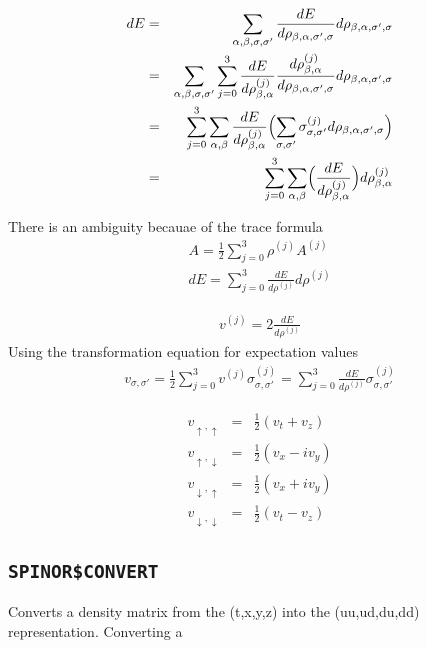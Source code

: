 \documentclass[11pt,a4paper]{report}
\begin{document}
\begin{eqnarray}
dE&=&
\sum_{\alpha,\beta,\sigma,\sigma'}
\frac{dE}{d\rho_{\beta,\alpha,\sigma',\sigma}}
d\rho_{\beta,\alpha,\sigma',\sigma}
\nonumber\\
&=&\sum_{\alpha,\beta,\sigma,\sigma'}
\sum_{j=0}^3\frac{dE}{d\rho^{(j)}_{\beta,\alpha}}
\frac{d\rho^{(j)}_{\beta,\alpha}}{d\rho_{\beta,\alpha,\sigma',\sigma}}
d\rho_{\beta,\alpha,\sigma',\sigma}
\nonumber\\
&=&\sum_{j=0}^3
\sum_{\alpha,\beta}
\frac{dE}{d\rho^{(j)}_{\beta,\alpha}}
\Bigl(
\sum_{\sigma,\sigma'}
\sigma^{(j)}_{\sigma,\sigma'}
d\rho_{\beta,\alpha,\sigma',\sigma}
\Bigr)
\nonumber\\
&=&\sum_{j=0}^3
\sum_{\alpha,\beta}
\Bigl(\frac{dE}{d\rho^{(j)}_{\beta,\alpha}}\Bigr)
d\rho^{(j)}_{\beta,\alpha}
\end{eqnarray}

There is an ambiguity becauae of the trace formula
\begin{eqnarray}
A=\frac{1}{2}\sum_{j=0}^3 \rho^{(j)} A^{(j)}
\\
dE=\sum_{j=0}^3 \frac{dE}{d\rho^{(j)}}d\rho^{(j)}
\end{eqnarray}

\begin{eqnarray}
v^{(j)}=2\frac{dE}{d\rho^{(j)}}
\end{eqnarray}
Using the transformation equation for expectation values
\begin{eqnarray}
v_{\sigma,\sigma'}
=\frac{1}{2}\sum_{j=0}^3 v^{(j)}\sigma^{(j)}_{\sigma,\sigma'}
=\sum_{j=0}^3 \frac{dE}{d\rho^{(j)}}
\sigma^{(j)}_{\sigma,\sigma'}
\end{eqnarray}

\begin{eqnarray}
v_{\uparrow,\uparrow}&=&\frac{1}{2}(v_t+v_z)
\nonumber\\
v_{\uparrow,\downarrow}&=&\frac{1}{2}(v_x-iv_y)
\nonumber\\
v_{\downarrow,\uparrow}&=&\frac{1}{2}(v_x+iv_y)
\nonumber\\
v_{\downarrow,\downarrow}&=&\frac{1}{2}(v_t-v_z)
\end{eqnarray}


\subsection{\texttt{SPINOR\$CONVERT}}
Converts a density matrix from the  (t,x,y,z) into the (uu,ud,du,dd)
representation. Converting a 
\end{document}
